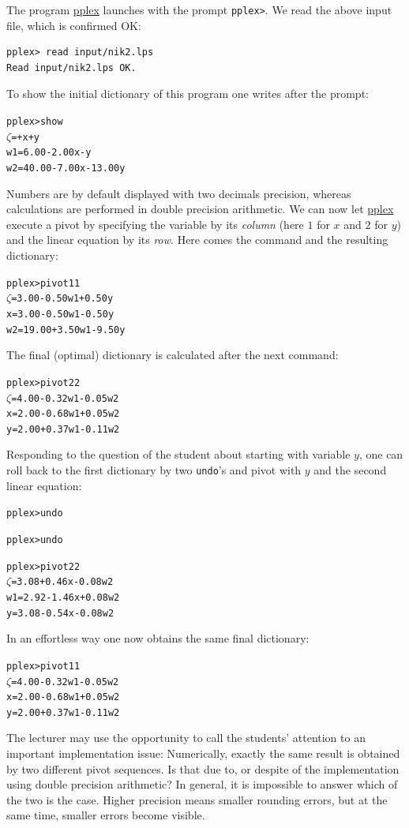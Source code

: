 \documentclass[ukenglish]{nik}
\begin{document}
The program \url{pplex} launches with the prompt \verb|pplex>|.
We read the above input file, which is confirmed OK:
\begin{verbatim}
pplex> read input/nik2.lps
Read input/nik2.lps OK.
\end{verbatim}
To show the initial dictionary of this program one writes after the prompt:
\begin{alltt}
pplex> show
 \(\zeta\) =       +     x +      y
w1 =  6.00 - 2.00x -      y
w2 = 40.00 - 7.00x - 13.00y
\end{alltt}
Numbers are by default displayed with two decimals precision, whereas
calculations are performed in double precision arithmetic.
We can now let \url{pplex} execute a pivot by specifying
the variable by its \emph{column} (here $1$ for $x$ and $2$ for $y$)
and the linear equation by its \emph{row}. 
Here comes the command and the resulting dictionary:
\begin{alltt}
pplex> pivot 1 1
 \(\zeta\) =  3.00 - 0.50w1 + 0.50y
 x =  3.00 - 0.50w1 - 0.50y
w2 = 19.00 + 3.50w1 - 9.50y
\end{alltt}
The final (optimal) dictionary is calculated after the next command:
\begin{alltt}
pplex> pivot 2 2
 \(\zeta\) = 4.00 - 0.32w1 - 0.05w2
 x = 2.00 - 0.68w1 + 0.05w2
 y = 2.00 + 0.37w1 - 0.11w2
\end{alltt}
Responding to the question of the student about starting with variable $y$, 
one can roll back to the first dictionary by two \verb|undo|'s and pivot
with $y$ and the second linear equation:
\begin{alltt}
pplex> undo

pplex> undo

pplex> pivot 2 2
 \(\zeta\) = 3.08 + 0.46x - 0.08w2
w1 = 2.92 - 1.46x + 0.08w2
 y = 3.08 - 0.54x - 0.08w2
\end{alltt}
In an effortless way one now obtains the same final dictionary:
\begin{alltt}
pplex> pivot 1 1 
 \(\zeta\) = 4.00 - 0.32w1 - 0.05w2
 x = 2.00 - 0.68w1 + 0.05w2
 y = 2.00 + 0.37w1 - 0.11w2
\end{alltt}
The lecturer may use the opportunity to call the students' attention to an important implementation issue: Numerically, exactly the same result is obtained by two different pivot sequences. Is that due to, or despite of the implementation using double precision arithmetic?
In general, it is impossible to answer which of the two is the case. Higher precision means smaller rounding errors,
but at the same time, smaller errors become visible. 
\end{document}
